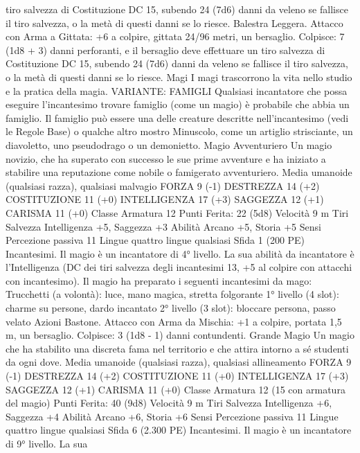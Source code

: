 \begin{multicols}{2}
tiro salvezza di Costituzione DC 15, subendo 24 (7d6) danni da veleno se
fallisce il tiro salvezza, o la metà di questi danni se lo riesce.
Balestra Leggera. Attacco con Arma a Gittata: +6 a colpire,
gittata 24/96 metri, un bersaglio.
Colpisce: 7 (1d8 + 3) danni perforanti, e il bersaglio deve effettuare un
tiro salvezza di Costituzione DC 15, subendo 24 (7d6) danni da veleno se
fallisce il tiro salvezza, o la metà di questi danni se lo riesce.
Magi
I magi trascorrono la vita nello studio e la pratica della
magia.
VARIANTE: FAMIGLI
Qualsiasi incantatore che possa eseguire l’incantesimo trovare
famiglio (come un magio) è probabile che abbia un famiglio. Il
famiglio può essere una delle creature descritte nell’incantesimo
(vedi le Regole Base) o qualche altro mostro Minuscolo, come
un artiglio strisciante, un diavoletto, uno pseudodrago o un
demonietto.
Magio Avventuriero
Un magio novizio, che ha superato con successo le sue
prime avventure e ha iniziato a stabilire una
reputazione come nobile o famigerato avventuriero.
Media umanoide (qualsiasi razza), qualsiasi malvagio
FORZA 9 (-1)
DESTREZZA 14 (+2)
COSTITUZIONE 11 (+0)
INTELLIGENZA 17 (+3)
SAGGEZZA 12 (+1)
CARISMA 11 (+0)
Classe Armatura 12
\hspace*{0pt}\hfill{Punti Ferita}: 22 (5d8)
Velocità 9 m
Tiri Salvezza Intelligenza +5, Saggezza +3
Abilità Arcano +5, Storia +5
Sensi Percezione passiva 11
Lingue quattro lingue qualsiasi
Sfida 1 (200 PE)
Incantesimi. Il magio è un incantatore di 4° livello. La sua
abilità da incantatore è l’Intelligenza (DC dei tiri salvezza degli
incantesimi 13, +5 al colpire con attacchi con incantesimo). Il
magio ha preparato i seguenti incantesimi da mago:
Trucchetti (a volontà): luce, mano magica, stretta folgorante
1° livello (4 slot): charme su persone, dardo incantato
2° livello (3 slot): bloccare persona, passo velato
Azioni
Bastone. Attacco con Arma da Mischia: +1 a colpire, portata 1,5
m, un bersaglio.
Colpisce: 3 (1d8 - 1) danni contundenti.
Grande Magio
Un magio che ha stabilito una discreta fama nel
territorio e che attira intorno a sé studenti da ogni dove.
Media umanoide (qualsiasi razza), qualsiasi allineamento
FORZA 9 (-1)
DESTREZZA 14 (+2)
COSTITUZIONE 11 (+0)
INTELLIGENZA 17 (+3)
SAGGEZZA 12 (+1)
CARISMA 11 (+0)
Classe Armatura 12 (15 con armatura del magio)
\hspace*{0pt}\hfill{Punti Ferita}: 40 (9d8)
Velocità 9 m
Tiri Salvezza Intelligenza +6, Saggezza +4
Abilità Arcano +6, Storia +6
Sensi Percezione passiva 11
Lingue quattro lingue qualsiasi
Sfida 6 (2.300 PE)
Incantesimi. Il magio è un incantatore di 9° livello. La sua

\end{multicols}

